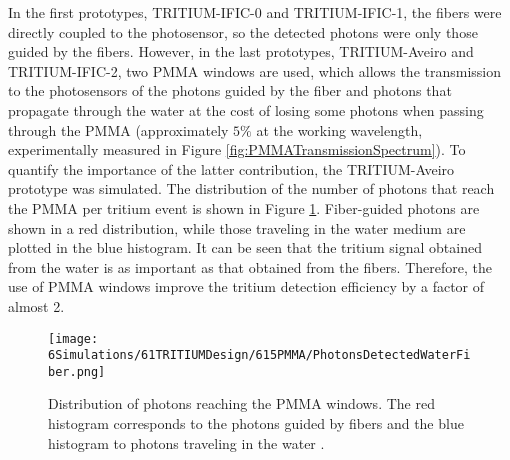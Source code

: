 In the first prototypes, TRITIUM-IFIC-0 and TRITIUM-IFIC-1, the fibers were directly coupled to the photosensor, so the detected photons were only those guided by the fibers. However, in the last prototypes, TRITIUM-Aveiro and TRITIUM-IFIC-2, two PMMA windows are used, which allows the transmission to the photosensors of the photons guided by the fiber and photons that propagate through the water at the cost of losing some photons when passing through the PMMA (approximately $5\%$ at the working wavelength, experimentally measured in Figure \ref{fig:PMMATransmissionSpectrum}). To quantify the importance of the latter contribution, the TRITIUM-Aveiro prototype was simulated. The distribution of the number of photons that reach the PMMA per tritium event is shown in Figure \ref{fig:PMMAEffect}. Fiber-guided photons are shown in a red distribution, while those traveling in the water medium are plotted in the blue histogram. It can be seen that the tritium signal obtained from the water is as important as that obtained from the fibers. Therefore, the use of PMMA windows improve the tritium detection efficiency by a factor of almost 2.

\begin{figure}[hbtp]
\centering
\texttt{[image: 6Simulations/61TRITIUMDesign/615PMMA/PhotonsDetectedWaterFiber.png]}
\caption{Distribution of photons reaching the PMMA windows. The red histogram corresponds to the photons guided by fibers and the blue histogram to photons traveling in the water \cite{SimulationPaperCarlos}.\label{fig:PMMAEffect}}
\end{figure}

